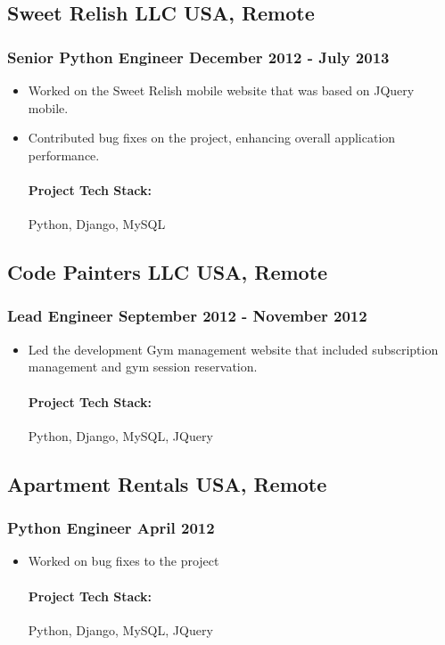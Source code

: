 \documentclass[11pt]{article} %
\begin{document}
\subsection{Sweet Relish LLC \hfill USA, Remote}
\subsubsection{Senior Python Engineer \hfill  December 2012 - July 2013}
\begin{itemize}
    \item Worked on the Sweet Relish mobile website that was based on JQuery mobile.
    \item Contributed bug fixes on the project, enhancing overall application performance.

    \paragraph{Project Tech Stack:} Python, Django, MySQL
\end{itemize}

\subsection{Code Painters LLC \hfill USA, Remote}
\subsubsection{Lead Engineer \hfill  September 2012 - November 2012}
\begin{itemize}
    \item Led the development Gym management website that included subscription management and gym session reservation.

    \paragraph{Project Tech Stack:} Python, Django, MySQL, JQuery
\end{itemize}

\subsection{Apartment Rentals \hfill USA, Remote}
\subsubsection{Python Engineer \hfill  April 2012}
\begin{itemize}
    \item Worked on bug fixes to the project
    \paragraph{Project Tech Stack:} Python, Django, MySQL, JQuery
\end{itemize}
\end{document}
